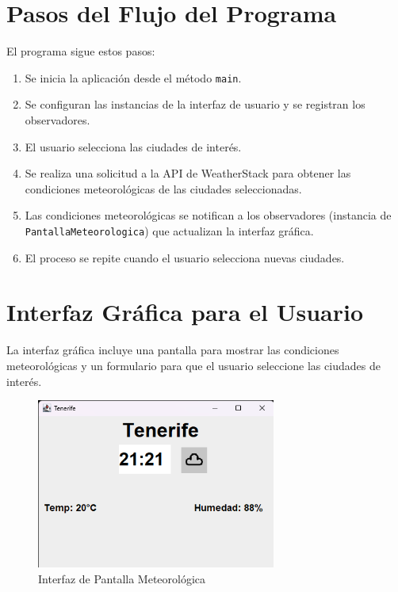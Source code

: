 \documentclass{article}
\begin{document}
\section{Pasos del Flujo del Programa}
El programa sigue estos pasos:

\begin{enumerate}
    \item Se inicia la aplicación desde el método \texttt{main}.
    \item Se configuran las instancias de la interfaz de usuario y se registran los observadores.
    \item El usuario selecciona las ciudades de interés.
    \item Se realiza una solicitud a la API de WeatherStack para obtener las condiciones meteorológicas de las ciudades seleccionadas.
    \item Las condiciones meteorológicas se notifican a los observadores (instancia de \texttt{PantallaMeteorologica}) que actualizan la interfaz gráfica.
    \item El proceso se repite cuando el usuario selecciona nuevas ciudades.
\end{enumerate}

\section{Interfaz Gráfica para el Usuario}
La interfaz gráfica incluye una pantalla para mostrar las condiciones meteorológicas y un formulario para que el usuario seleccione las ciudades de interés.

\begin{figure}[H]
    \centering
    \includegraphics[width=0.7\textwidth]{Pantalla.png}
    \caption{Interfaz de Pantalla Meteorológica}
    \label{fig:pantalla_meteorologica}
\end{figure}
\end{document}
